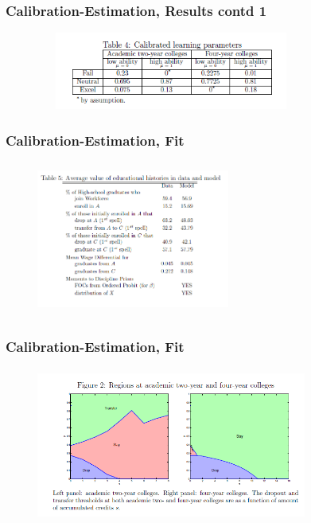 \begin{frame}
	\frametitle{Calibration-Estimation, Results contd 1}
			\begin{figure}[H] 
				\caption*{}
				\centering
				\includegraphics[width=3.5in, height=1in]{Figures/T/table4.png}
		\end{figure}
\end{frame}

\begin{frame}
	\frametitle{Calibration-Estimation, Fit}
			\begin{figure}[H] 
				\caption*{}
				\centering
				\includegraphics[width=2.5in, height=2in]{Figures/T/table5.png}
		\end{figure}
\end{frame}

\begin{frame}
	\frametitle{Calibration-Estimation, Fit}
			\begin{figure}[H] 
				\caption*{}
				\centering
				\includegraphics[width=3.5in, height=2in]{Figures/T/figure2.png}
			\end{figure}
\end{frame}

